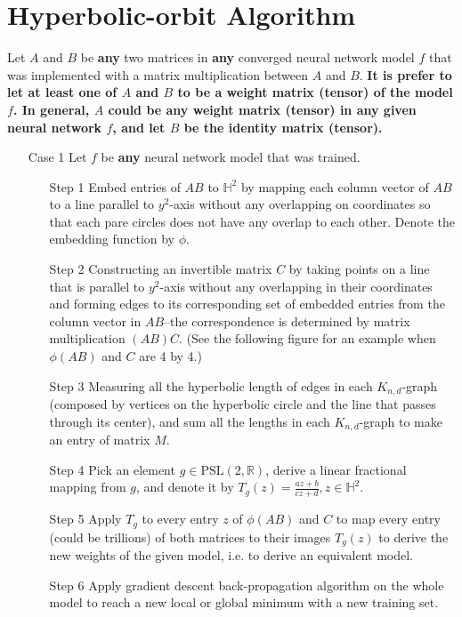 \documentclass{article}
\theoremstyle{plain}
\theoremstyle{plain} %
\theoremstyle{definition}  %
\theoremstyle{remark}  %
\theoremstyle{plain}
\begin{document}
\section{Hyperbolic-orbit Algorithm}

Let $A$ and $B$ be \textbf{any} two matrices in \textbf{any} converged neural network model $f$ that was implemented with a matrix multiplication between $A$ and $B$. \textbf{It is prefer to let at least one of $A$ and $B$ to be a weight matrix (tensor) of the model $f$. In general, $A$ could be any weight matrix (tensor) in any given neural network $f$, and let $B$ be the identity matrix (tensor).}
\begin{itemize}
\item[Case 1] Let $f$ be \textbf{any} neural network model that was trained.

\begin{itemize}

\item[Step 1]
Embed entries of $AB$ to $\mathbb{H}^2$ by mapping each column vector of $AB$ to a line parallel to $y^2$-axis without any overlapping on coordinates so that each pare circles does not have any overlap to each other. Denote the embedding function by $\phi$.

\item[Step 2] Constructing an invertible matrix $C$ by taking points on a line that is parallel to $y^2$-axis without any overlapping in their coordinates and forming edges to its corresponding set of embedded entries from the column vector in $AB$--the correspondence is determined by matrix multiplication $(AB)C$. (See the following figure for an example when $\phi(AB)$ and $C$ are 4 by 4.)
\item[Step 3] Measuring all the hyperbolic length of edges in each $K_{n,d}$-graph (composed by vertices on the hyperbolic circle and the line that passes through its center), and sum all the lengths in each $K_{n,d}$-graph to make an entry of matrix $M$.

\item[Step 4] Pick an element $g\in\text{PSL}(2,\mathbb{R})$, derive a linear fractional mapping from $g$, and denote it by $T_g(z)=\frac{az+b}{cz+d}, z\in\mathbb{H}^2$.
\item[Step 5] Apply $T_g$ to every entry $z$ of $\phi(AB)$ and $C$ to map every entry (could be trillions) of both matrices to their images $T_g(z)$ to derive the new weights of the given model, i.e. to derive an equivalent model.

\item[Step 6] Apply gradient descent back-propagation algorithm on the whole model to reach a new local or global minimum with a new training set.
\end{itemize}



\end{itemize}
\end{document}
